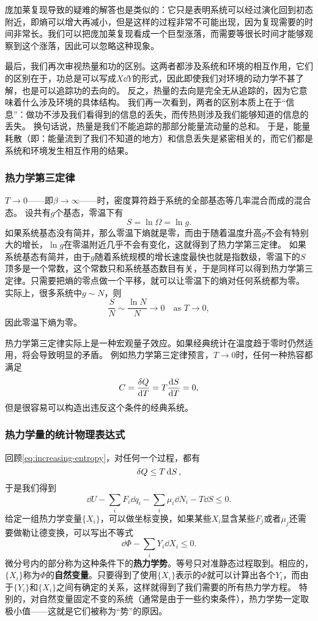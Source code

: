 \documentclass[hyperref, UTF8, a4paper]{ctexart}
\begin{document}
庞加莱复现导致的疑难的解答也是类似的：它只是表明系统可以经过演化回到初态附近，即熵可以增大再减小，但是这样的过程非常不可能出现，因为复现需要的时间非常长。我们可以把庞加莱复现看成一个巨型涨落，而需要等很长时间才能够观察到这个涨落，因此可以忽略这种现象。

最后，我们再次审视热量和功的区别。这两者都涉及系统和环境的相互作用，它们的区别在于，功总是可以写成$X\dd{Y}$的形式，因此即使我们对环境的动力学不甚了解，也是可以追踪功的去向的。
反之，热量的去向是完全无从追踪的，因为它意味着什么涉及环境的具体结构。
我们再一次看到，两者的区别本质上在于“信息”：做功不涉及我们看得到的信息的丢失，而传热则涉及我们能够知道的信息的丢失。
换句话说，热量是我们不能追踪的那部分能量流动量的总和。
于是，能量耗散（即：能量流到了我们不知道的地方）和信息丢失是紧密相关的，而它们都是系统和环境发生相互作用的结果。

\subsubsection{热力学第三定律}

$T\to 0$——即$\beta \to \infty$——时，密度算符趋于系统的全部基态等几率混合而成的混合态。
设共有$g$个基态，零温下有
\[
    S = \ln \Omega = \ln g.
\]
如果系统基态没有简并，那么零温下熵就是零，而由于随着温度升高$g$不会有特别大的增长，$\ln g$在零温附近几乎不会有变化，这就得到了热力学第三定律。
如果系统基态有简并，由于$g$随着系统规模的增长速度最快也就是指数级，零温下的$S$顶多是一个常数，这个常数只和系统基态数目有关，于是同样可以得到热力学第三定律。只需要把熵的零点做一个平移，就可以让零温下的熵对任何系统都为零。
实际上，很多系统中$g \sim N$，则
\[
    \frac{S}{N} \sim \frac{\ln N}{N} \to 0 \quad \text{as } T \to 0,
\]
因此零温下熵为零。

热力学第三定律实际上是一种宏观量子效应。如果经典统计在温度趋于零时仍然适用，将会导致明显的矛盾。
例如热力学第三定律预言，$T\to 0$时，任何一种热容都满足
\[
    C = \frac{\var{Q}}{\dd{T}} = T \frac{\dd{S}}{\dd{T}} = 0,
\]
但是很容易可以构造出违反这个条件的经典系统。

\subsubsection{热力学量的统计物理表达式}

回顾\eqref{eq:increasing-entropy}，对任何一个过程，都有
\[
    \var{Q} \leq T \dd{S},
\]
于是我们得到
\begin{equation}
    \dd{U} - \sum_i F_i \dd{q_i} - \sum_i \mu_i \dd{N_i} - T \dd{S} \leq 0.
\end{equation}
给定一组热力学变量$\{X_i\}$，可以做坐标变换，如果某些$X_i$显含某些$F_j$或者$\mu_j$还需要做勒让德变换，可以写出不等式
\[
    \dd{\Phi} - \sum_i Y_i \dd{X_i} \leq 0.
\]
微分号内的部分称为这种条件下的\textbf{热力学势}。等号只对准静态过程取到。相应的，$\{X_i\}$称为$\Phi$的\textbf{自然变量}。只要得到了使用$\{X_i\}$表示的$\Phi$就可以计算出各个$Y_i$，而由于$\{Y_i\}$和$\{X_i\}$之间有确定的关系，这样就得到了我们需要的所有热力学方程。
特别的，对自然变量固定不变的系统（通常是由于一些约束条件），热力学势一定取极小值——这就是它们被称为“势”的原因。
\end{document}
